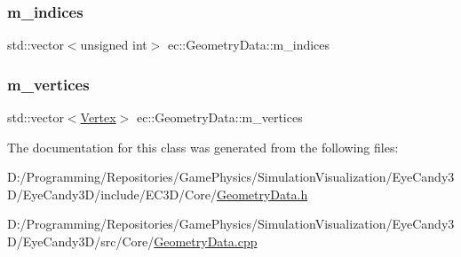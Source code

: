 \subsubsection{\texorpdfstring{m\+\_\+indices}{m\_indices}}
{\footnotesize\ttfamily std\+::vector$<$unsigned int$>$ ec\+::\+Geometry\+Data\+::m\+\_\+indices}

\mbox{\label{classec_1_1_geometry_data_ade3f4dd48315b696846bb2c00267394c}} 
\subsubsection{\texorpdfstring{m\+\_\+vertices}{m\_vertices}}
{\footnotesize\ttfamily std\+::vector$<$\mbox{\hyperlink{structec_1_1_vertex}{Vertex}}$>$ ec\+::\+Geometry\+Data\+::m\+\_\+vertices}



The documentation for this class was generated from the following files\+:\begin{DoxyCompactItemize}
\item 
D\+:/\+Programming/\+Repositories/\+Game\+Physics/\+Simulation\+Visualization/\+Eye\+Candy3\+D/\+Eye\+Candy3\+D/include/\+E\+C3\+D/\+Core/\mbox{\hyperlink{_geometry_data_8h}{Geometry\+Data.\+h}}\item 
D\+:/\+Programming/\+Repositories/\+Game\+Physics/\+Simulation\+Visualization/\+Eye\+Candy3\+D/\+Eye\+Candy3\+D/src/\+Core/\mbox{\hyperlink{_geometry_data_8cpp}{Geometry\+Data.\+cpp}}\end{DoxyCompactItemize}
